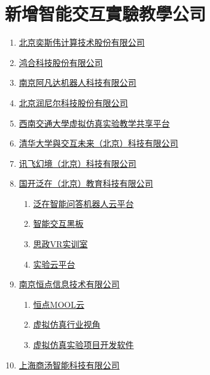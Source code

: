 \section{新增智能交互實驗教學公司}


\begin{enumerate}
    \item \href{https://www.eswincomputing.com/industry.html}{北京奕斯伟计算技术股份有限公司}
    \item \href{https://www.honghe-tech.com/zhjy-2.html}{鸿合科技股份有限公司}
    \item \href{http://www.avatarmind.com/product-college.html}{南京阿凡达机器人科技有限公司}
    \item \href{https://www.rainier.net.cn/}{北京润尼尔科技股份有限公司}
    \item \href{https://vlab.swjtu.edu.cn/cms/c_36.html}{西南交通大學虚拟仿真实验教学共享平台}
    \item \href{https://www.ijiaodui.com/index.php?id=21}{清华大学與交互未来（北京）科技有限公司}
    \item \href{http://www.xunfeivr.com/ProductsStd_213.html}{讯飞幻境（北京）科技有限公司}
    \item \href{http://www.gkfz.net/project/sh_intelligentblackboard}{国开泛在（北京）教育科技有限公司}
          \begin{enumerate}
              \item \href{http://www.gkfz.net/project/software_robot}{泛在智能问答机器人云平台}
              \item \href{http://www.gkfz.net/project/sh_intelligentblackboard}{智能交互黑板}
              \item \href{http://www.gkfz.net/project/sh_trainingroom}{思政VR实训室}
              \item \href{http://www.gkfz.net/project/software_cloud}{实验云平台}
          \end{enumerate}
    \item \href{https://www.hdvrar.com/}{南京恒点信息技术有限公司}
          \begin{enumerate}
              \item \href{http://www.new.hdmool.com/}{恒点MOOL云}
              \item \href{https://www.hdvrar.com/col/hangyeshijiao.html}{虚拟仿真行业视角}
              \item \href{https://www.xr-edit.com/}{虚拟仿真实验项目开发软件}
          \end{enumerate}
    \item \href{https://www.sensetime.com/cn/csr_education}{上海商汤智能科技有限公司}

\end{enumerate}
